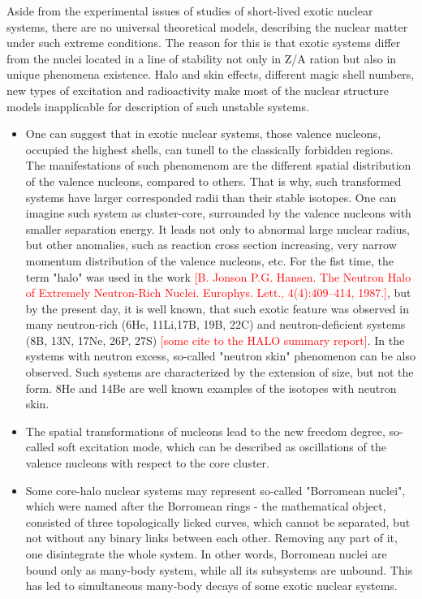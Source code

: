 Aside from the experimental issues of studies of short-lived exotic nuclear systems, there are no universal theoretical models, describing the nuclear matter under such extreme conditions.
The reason for this is that exotic systems differ from the nuclei located in a line of stability not only in Z/A ration but also in unique phenomena existence.
Halo and skin effects, different magic shell numbers, new types of excitation and radioactivity make most of the nuclear structure models inapplicable for description of such unstable systems.

\begin{itemize}
	\item 
	One can suggest that in exotic nuclear systems, those valence nucleons, occupied the highest shells, can tunell to the classically forbidden regions. 
	The manifestations of such phenomenom are the different spatial distribution of the valence nucleons, compared to others. 
	That is why, such transformed systems have larger corresponded radii than their stable isotopes.
	One can imagine such system as cluster-core, surrounded by the valence nucleons with smaller separation energy.
	It leads not only to abnormal large nuclear radius, but other anomalies, such as reaction cross section increasing, very narrow momentum distribution of the valence nucleons, etc.
	For the fist time, the term "halo" was used in the work \textcolor{red}{[B. Jonson P.G. Hansen. The Neutron Halo of Extremely Neutron-Rich Nuclei. Europhys. Lett., 4(4):409–414, 1987.]}, but by the present day, it is well known, that such exotic feature was observed in many neutron-rich (6He, 11Li,17B, 19B, 22C) and neutron-deficient systems (8B, 13N, 17Ne, 26P, 27S) \textcolor{red}{[some cite to the HALO summary report]}.
	In the systems with neutron excess, so-called "neutron skin" phenomenon can be also observed.
	Such systems are characterized by the extension of size, but not the form. 8He and 14Be are well known examples of the isotopes with neutron skin.
	
	\item 
	The spatial transformations of nucleons lead to the new freedom degree, so-called soft excitation mode, which can be described as oscillations of the valence nucleons with respect to the core cluster. 
	
	\item 
	Some core-halo nuclear systems may represent so-called "Borromean nuclei", which were named after the Borromean rings - the mathematical object, consisted of three topologically licked curves, which cannot be separated, but not without any binary links between each other.
	Removing any part of it, one disintegrate the whole system.
	In other words, Borromean nuclei are bound only as many-body system, while all its subsystems are unbound.
	This has led to simultaneous many-body decays of some exotic nuclear systems.
	

\end{itemize}



